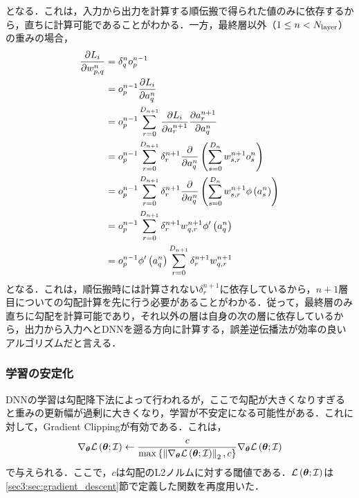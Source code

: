 となる．これは，入力から出力を計算する順伝搬で得られた値のみに依存するから，直ちに計算可能であることがわかる．一方，最終層以外（$1 \le n < N_{\text{layer}}$）の重みの場合，
\begin{align}
    \pdv{L_{i}}{w_{p, q}^{n}} & = \delta_{q}^{n} o_{p}^{n - 1}                                                                                                            \\
                                        & = o_{p}^{n - 1} \pdv{L_{i}}{a_{q}^{n}}                                                                                                    \\
                                        & = o_{p}^{n - 1} \sum_{r = 0}^{D_{n + 1}} \pdv{L_{i}}{a_{r}^{n + 1}} \pdv{a_{r}^{n + 1}}{a_{q}^{n}}                              \\
                                        & = o_{p}^{n - 1} \sum_{r = 0}^{D_{n + 1}} \delta_{r}^{n + 1} \pdv{a_{q}^{n}} \left(\sum_{s = 0}^{D_{n}} w_{s, r}^{n + 1} o_{s}^{n}\right)          \\
                                        & = o_{p}^{n - 1} \sum_{r = 0}^{D_{n + 1}} \delta_{r}^{n + 1} \pdv{a_{q}^{n}} \left(\sum_{s = 0}^{D_{n}} w_{s, r}^{n + 1} \phi\left(a_{s}^{n}\right)\right) \\
                                        & = o_{p}^{n - 1} \sum_{r = 0}^{D_{n + 1}} \delta_{r}^{n + 1} w_{q, r}^{n + 1} \phi'\left(a_{q}^{n}\right)                                          \\
                                        & = o_{p}^{n - 1} \phi'\left(a_{q}^{n}\right) \sum_{r = 0}^{D_{n + 1}} \delta_{r}^{n + 1} w_{q, r}^{n + 1}
\end{align}
となる．これは，順伝搬時には計算されない$\delta_{r}^{n + 1}$に依存しているから，$n + 1$層目についての勾配計算を先に行う必要があることがわかる．従って，最終層のみ直ちに勾配を計算可能であり，それ以外の層は自身の次の層に依存しているから，出力から入力へとDNNを遡る方向に計算する，誤差逆伝播法が効率の良いアルゴリズムだと言える．

\subsubsection{学習の安定化}
DNNの学習は勾配降下法によって行われるが，ここで勾配が大きくなりすぎると重みの更新幅が過剰に大きくなり，学習が不安定になる可能性がある．これに対して，Gradient Clippingが有効である．これは，
\begin{equation}
    \nabla_{\bm{\theta}} \mathcal{L}\left(\bm{\theta}; \mathcal{I}\right) \gets \frac{c}{\max \left\{\left\|\nabla_{\bm{\theta}} \mathcal{L}\left(\bm{\theta}; \mathcal{I}\right)\right\|_{2}, c\right\}} \nabla_{\bm{\theta}} \mathcal{L}\left(\bm{\theta}; \mathcal{I}\right)
\end{equation}
で与えられる．ここで，$c$は勾配のL2ノルムに対する閾値である．$\mathcal{L}\left(\bm{\theta}; \mathcal{I}\right)$は\ref{sec3:sec:gradient_descent}節で定義した関数を再度用いた．

